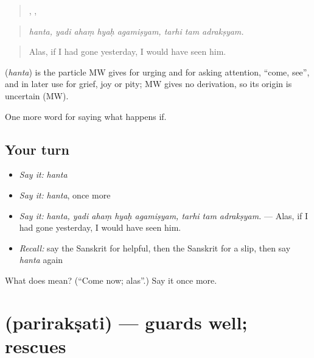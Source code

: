 \begin{quote}
,    ,   
\end{quote}

\begin{quote}
\emph{hanta, yadi ahaṃ hyaḥ agamiṣyam, tarhi tam adrakṣyam.}
\end{quote}

\begin{quote}
Alas, if I had gone yesterday, I would have seen him.
\end{quote}

\begin{cousinweb}
\textbf{} (\emph{hanta}) is the particle MW gives for urging and for asking attention, \textquotedblleft{}come, see\textquotedblright{}, and in later use for grief, joy or pity; MW gives no derivation, so its origin is uncertain (MW).
\end{cousinweb}

\begin{grammarlens}[title={What you've built}]
One more word for saying what happens if.
\end{grammarlens}

\subsection*{Your turn}
\begin{itemize}
\raggedright
  \item \emph{Say it:} \emph{hanta}
  \item \emph{Say it:} \emph{hanta}, once more
  \item \emph{Say it:} \emph{hanta, yadi ahaṃ hyaḥ agamiṣyam, tarhi tam adrakṣyam.} — Alas, if I had gone yesterday, I would have seen him.
  \item \emph{Recall:} say the Sanskrit for helpful, then the Sanskrit for a slip, then say \emph{hanta} again
\end{itemize}

\begin{tcolorbox}[breakable,colback=teal!4,colframe=teal!35!black,title={Before you move on}]
What does  mean? (\textquotedblleft{}Come now; alas\textquotedblright{}.) Say it once more.
\end{tcolorbox}
\section[\texorpdfstring{\sk{परिरक्षति} (parirakṣati)}{परिरक्षति (parirakṣati)}]{ (parirakṣati) — guards well; rescues}

